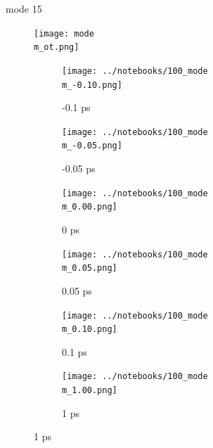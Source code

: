 \documentclass{beamer}
\begin{document}
\renewcommand\m{15}
\begin{frame}{mode \m}
			\vspace{\vh mm}
	\begin{figure}
		\centering
		\texttt{[image: mode\\m\_ot.png]}
	\end{figure}
	\begin{figure}
		\centering
		\begin{subfigure}[b]{\w\textwidth}
			\centering
			\texttt{[image: ../notebooks/100\_mode\\m\_-0.10.png]}
			\caption{-0.1 ps}
		\end{subfigure}
		\begin{subfigure}[b]{\w\textwidth}
			\centering
			\texttt{[image: ../notebooks/100\_mode\\m\_-0.05.png]}
			\caption{-0.05 ps}
		\end{subfigure}
		\begin{subfigure}[b]{\w\textwidth}
			\centering
			\texttt{[image: ../notebooks/100\_mode\\m\_0.00.png]}
			\caption{0 ps}
		\end{subfigure}
		\begin{subfigure}[b]{\w\textwidth}
			\centering
			\texttt{[image: ../notebooks/100\_mode\\m\_0.05.png]}
			\caption{0.05 ps}
		\end{subfigure}
		\begin{subfigure}[b]{\w\textwidth}
			\centering
			\texttt{[image: ../notebooks/100\_mode\\m\_0.10.png]}
			\caption{0.1 ps}
		\end{subfigure}
		\begin{subfigure}[b]{\w\textwidth}
			\centering
			\texttt{[image: ../notebooks/100\_mode\\m\_1.00.png]}
			\caption{1 ps}
		\end{subfigure}
	\end{figure}
\end{frame}
\end{document}
